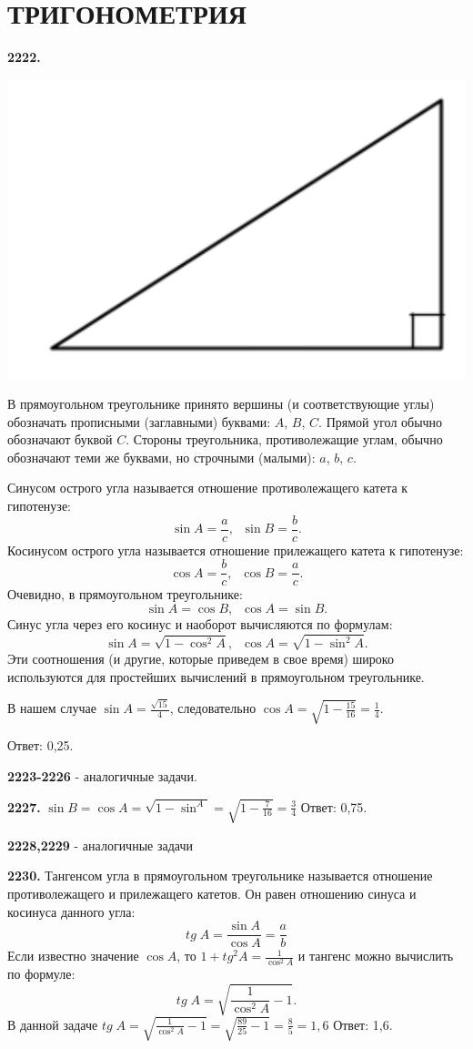 \section{ТРИГОНОМЕТРИЯ}

\textbf{2222.}

{\centering \includegraphics[width=0.35\linewidth]{Geometry/Content/51.png}
	
}

В прямоугольном треугольнике принято вершины (и соответствующие углы) обозначать прописными (заглавными) буквами: $A$, $B$, $C$. Прямой угол обычно обозначают буквой $C$. Стороны треугольника, противолежащие углам, обычно обозначают теми же буквами, но строчными (малыми): $a$, $b$, $c$.

Синусом острого угла называется отношение противолежащего катета к гипотенузе:
\[
\sin{A} = \frac{a}{c}, \;\; \sin{B}=\frac{b}{c}.
\]
Косинусом острого угла называется отношение прилежащего катета к гипотенузе:
\[
\cos{A} = \frac{b}{c}, \;\; \cos{B}=\frac{a}{c}.
\]
Очевидно, в прямоугольном треугольнике:
\[
\sin{A} = \cos{B}, \;\; \cos{A} = \sin{B}.
\]
Синус угла через его косинус и наоборот вычисляются по формулам:
\[
\sin{A} = \sqrt{1-\cos^2{A}}, \;\; \cos{A} = \sqrt{1 - \sin^2{A}}.
\]
 Эти соотношения (и другие, которые приведем в свое время) широко используются для простейших вычислений в прямоугольном треугольнике.
 
 В нашем случае  $\sin{A} = \frac{\sqrt{15}}{4}$, следовательно $\cos{A}=\sqrt{1 - \frac{15}{16}}=\frac{1}{4}.$ 
 
 \null \hspace*{\fill} Ответ: 0,25.
 
 \textbf{2223-2226} - аналогичные задачи.
 
 \textbf{2227.} $\sin{B} = \cos{A} = \sqrt{1-\sin^{A}}=\sqrt{1-\frac{7}{16}}=\frac{3}{4}$ \newline \null \hspace*{\fill} Ответ: 0,75.
 
 \textbf{2228,2229} - аналогичные задачи
 
 \textbf{2230.} Тангенсом угла в прямоугольном треугольнике называется отношение противолежащего и прилежащего катетов. Он равен отношению синуса и косинуса данного угла:
 \[
 tg\;A = \frac{\sin{A}}{\cos{A}} = \frac{a}{b}
 \]
 Если известно значение $\cos{A}$, то $1+tg^2A=\frac{1}{\cos^2{A}}$ и тангенс можно вычислить по формуле:
 \[
 tg\;A=\sqrt{\frac{1}{\cos^2{A}} - 1}.
 \]
 В данной задаче $tg\;A=\sqrt{\frac{1}{\cos^2{A}} - 1} = \sqrt{\frac{89}{25} - 1} = \frac{8}{5}=1,6$ \newline \null \hspace*{\fill} Ответ: 1,6.
 
